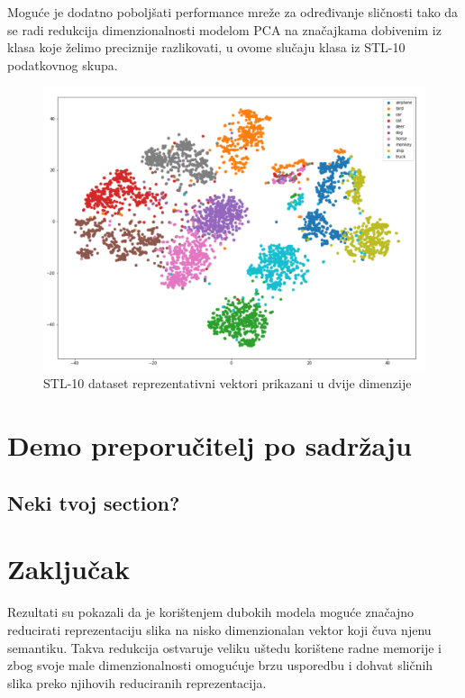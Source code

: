 \documentclass[times, utf8, proizvoljni, numeric]{fer}
\begin{document}
Moguće je dodatno poboljšati performance mreže za određivanje sličnosti tako da se radi redukcija dimenzionalnosti modelom PCA na značajkama dobivenim iz klasa koje želimo preciznije razlikovati, u ovome slučaju klasa iz STL-10 podatkovnog skupa.

\begin{figure}[!ht]
	\begin{center}
		\captionsetup{justification=centering}
		\includegraphics[width=1.\textwidth]{./imgs/stl_10_tsne.png}
		\caption{STL-10 dataset reprezentativni vektori prikazani u dvije dimenzije}
		\label{fg:stl_10_tsne}
	\end{center}
\end{figure}

\chapter{Demo preporučitelj po sadržaju}

\section{Neki tvoj section?}


\chapter{Zaključak}

Rezultati su pokazali da je korištenjem dubokih modela moguće značajno reducirati reprezentaciju slika na nisko dimenzionalan vektor koji čuva njenu semantiku. Takva redukcija ostvaruje veliku uštedu korištene radne memorije i zbog svoje male dimenzionalnosti omogućuje brzu usporedbu i dohvat sličnih slika preko njihovih reduciranih reprezentacija. 
\end{document}
